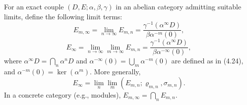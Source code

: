\begin{definition}
For an exact couple $(D, E; \alpha, \beta, \gamma)$ in an abelian category admitting suitable limits, define the following limit terms:
\[
E_{m,\infty} = \lim_{n \to \infty} E_{m,n} = \frac{\gamma^{-1}(\alpha^{\infty} D)}{\beta\alpha^{-m}(0)},
\tag{4.22}
\]
\[
E_{\infty} = \lim_{n \to \infty} \lim_{m \to \infty} E_{m,n} = \frac{\gamma^{-1}(\alpha^{\infty} D)}{\beta\alpha^{-\infty}(0)},
\tag{4.23}
\]
where $\alpha^{\infty}D = \bigcap_n \alpha^n D$ and $\alpha^{-\infty}(0) = \bigcup_m \alpha^{-m}(0)$ are defined as in (4.24), and $\alpha^{-m}(0) = \ker(\alpha^m)$. More generally,
\[
E_{\infty} = \lim_{n} \lim_{m} (E_{m,n}; \varrho_{m,n}, \sigma_{m,n}).
\tag{4.21}
\]
In a concrete category (e.g., modules), $E_{m,\infty} = \bigcap_n E_{m,n}$.
\end{definition}
